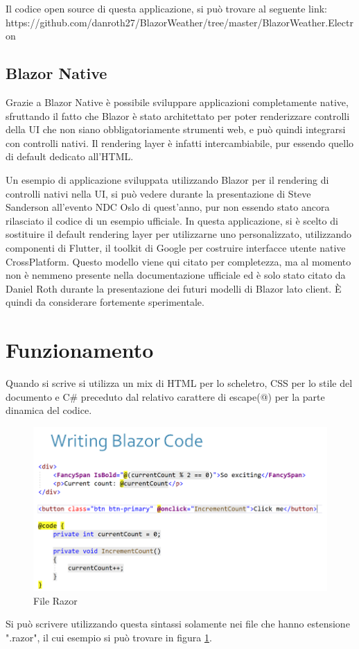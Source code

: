 Il codice open source di questa applicazione, si pu\`o trovare al seguente link: https://github.com/danroth27/BlazorWeather/tree/master/BlazorWeather.Electron
\pagebreak

\subsection{Blazor Native}\label{sez:bnative}
Grazie a Blazor Native \`e possibile sviluppare applicazioni completamente native, sfruttando il fatto che Blazor \`e stato architettato per poter renderizzare controlli della UI che non siano obbligatoriamente strumenti web, e pu\`o quindi integrarsi con controlli nativi.
Il rendering layer \`e infatti intercambiabile, pur essendo quello di default dedicato all'HTML.

Un esempio di applicazione sviluppata utilizzando Blazor per il rendering di controlli nativi nella UI, si pu\`o vedere durante la presentazione di Steve Sanderson all'evento NDC Oslo di quest'anno, pur non essendo stato ancora rilasciato il codice di un esempio ufficiale\cite{sandersonNDCBlutter}.
In questa applicazione, si \`e scelto di sostituire il default rendering layer per utilizzarne uno personalizzato, utilizzando componenti di Flutter, il toolkit di Google per costruire interfacce utente native CrossPlatform.
Questo modello viene qui citato per completezza, ma al momento non \`e nemmeno presente nella documentazione ufficiale ed \`e solo stato citato da Daniel Roth durante la presentazione dei futuri modelli di Blazor lato client\cite{blazorNative}.
\`E quindi da considerare fortemente sperimentale.

\section{Funzionamento}\label{sez:funzionamento}
Quando si scrive si utilizza un mix di HTML per lo scheletro, CSS per lo stile del documento e C\# preceduto dal relativo carattere di escape(@) per la parte dinamica del codice.
\begin{figure}[H]
	\centerline{\includegraphics[scale=0.55]{figure/RazorFile.png}}
	\caption{File Razor\cite{ryanNowakNDCSydney}}
	\label{fig:razorFile}
\end{figure}
Si pu\`o scrivere utilizzando questa sintassi solamente nei file che hanno estensione ".razor", il cui esempio si pu\`o trovare in figura \ref{fig:razorFile}.

